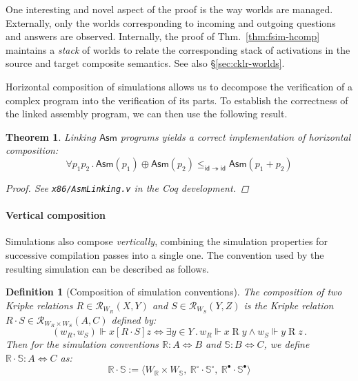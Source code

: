 \documentclass[draft,11pt]{report}
\newtheorem{definition}{Definition}
\newtheorem{theorem}{Theorem}
\newcommand{\kw}[1]{\ensuremath{ \mathsf{#1} }}
\newcommand{\ifr}[1]{\mathrel{[{#1}]}}
\newcommand{\que}{\circ}         %
\newcommand{\ans}{\bullet}       %
\begin{document}
One interesting and novel aspect of the proof
is the way worlds are managed.
Externally,
only the worlds corresponding to incoming and outgoing
questions and answers are observed.
Internally,
the proof of Thm.~\ref{thm:fsim-hcomp}
maintains a \emph{stack} of
worlds
to relate the corresponding stack of activations
in the source and target composite semantics.
See also \S\ref{sec:cklr-worlds}.

Horizontal composition of simulations
allows us to decompose the verification of a complex program
into the verification of its parts.
To establish the correctness of the linked assembly program,
we can then use the following result.

\begin{theorem} \label{thm:asmlinking} %
Linking \kw{Asm} programs
yields a correct implementation of
horizontal composition:
\[
    \forall p_1 p_2 \,.\,
      \kw{Asm}(p_1) \oplus \kw{Asm}(p_2)
      \le_{\kw{id} \twoheadrightarrow \kw{id}}
      \kw{Asm}(p_1 + p_2)
\]
\begin{proof}
See \texttt{x86/AsmLinking.v} in the Coq development.
\end{proof}
\end{theorem}


\paragraph{Vertical composition} %

Simulations also compose \emph{vertically},
combining the
simulation properties for successive compilation passes
into a single one.
The convention used by the resulting simulation
can be described as follows.

\begin{definition}[Composition of simulation conventions] %
The composition of two Kripke relations
$R \in \mathcal{R}_{W_R}(X, Y)$ and
$S \in \mathcal{R}_{W_S}(Y, Z)$
is the Kripke relation
$R \cdot S \in \mathcal{R}_{W_R \times W_S}(A, C)$
defined by:
\[
  (w_R, w_S) \Vdash x \ifr{R \cdot S} z \Leftrightarrow
  \exists y \in Y \,.\,
    w_R \Vdash x \mathrel{R} y \wedge
    w_S \Vdash y \mathrel{R} z \,.
\]
Then for the simulation conventions
$\mathbb{R} : A \Leftrightarrow B$ and
$\mathbb{S} : B \Leftrightarrow C$,
we define
$\mathbb{R} \cdot \mathbb{S} : A \Leftrightarrow C$ as:
\[
  \mathbb{R} \cdot \mathbb{S} :=
  \langle
    W_\mathbb{R} \times W_\mathbb{S}, \:
    \mathbb{R}^\que \cdot \mathbb{S}^\que, \:
    \mathbb{R}^\ans \cdot \mathbb{S}^\ans
  \rangle
\]
\end{definition}
\end{document}
